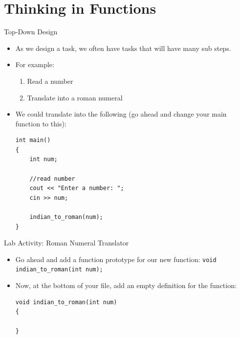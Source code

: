 \documentclass[]{beamer}
\begin{document}
\section{Thinking in Functions}

\begin{frame}[fragile]{Top-Down Design}
    \begin{itemize}[<+->]
        \item As we design a task, we often have tasks that will have
        many sub steps. 
        \item For example:
        \begin{enumerate}
            \item Read a number
            \item Translate into a roman numeral
        \end{enumerate}
        \item We could translate into the following (go ahead and
        change your main function to this):
        \newline
        \begin{adjustbox}{max totalheight=3.8cm}
        \begin{BVerbatim}
int main()
{
    int num;

    //read number
    cout << "Enter a number: ";
    cin >> num;

    indian_to_roman(num);
}
        \end{BVerbatim}
        \end{adjustbox}
    \end{itemize}
\end{frame}

\begin{frame}[fragile]{Lab Activity: Roman Numeral Translator}
    \begin{itemize}[<+->]
        \item Go ahead and add a function prototype for our new
            function:
            \newline\verb!void indian_to_roman(int num);!
        \item Now, at the bottom of your file, add an empty definition
            for the function:
            \newline
            \begin{BVerbatim}
void indian_to_roman(int num) 
{

}
            \end{BVerbatim}
    \end{itemize}
\end{frame}
\end{document}
